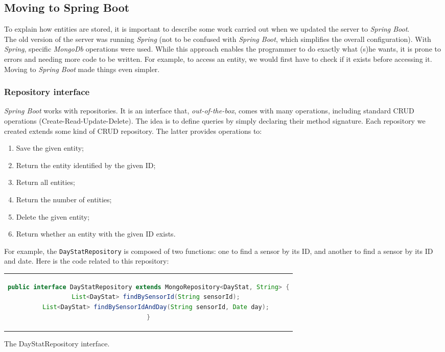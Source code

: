 \documentclass[a4paper, oneside, 11pt]{book}
\begin{document}
\subsection{Moving to Spring Boot}
To explain how entities are stored, it is important to describe some work carried out when we updated the server to \textit{Spring Boot}.\\

The old version of the server was running \textit{Spring} (not to be confused with \textit{Spring Boot}, which simplifies the overall configuration). With \textit{Spring}, specific \textit{MongoDb} operations were used. While this approach enables the programmer to do exactly what (s)he wants, it is prone to errors and needing more code to be written. For example, to access an entity, we would first have to check if it exists before accessing it. Moving to \textit{Spring Boot}  made things even simpler.

\subsubsection{Repository interface}
\textit{Spring Boot} works with repositories. It is an interface that, \emph{out-of-the-box}, comes with many operations, including standard CRUD operations (Create-Read-Update-Delete). The idea is to define queries by simply declaring their method signature. Each repository we created extends some kind of CRUD repository. The latter provides operations to:
\begin{enumerate}
	\item Save the given entity;
	\item Return the entity identified by the given ID;
	\item Return all entities;
	\item Return the number of entities;
	\item Delete the given entity;
	\item Return whether an entity with the given ID exists.
\end{enumerate}

For example, the \texttt{DayStatRepository} is composed of two functions: one to find a sensor by its ID, and another to find a sensor by its ID and date. Here is the code related to this repository:

\begin{listing}[!h]
	\centering
	\begin{tabular}{c}
		\begin{lstlisting}[language=Java]
public interface DayStatRepository extends MongoRepository<DayStat, String> {
    List<DayStat> findBySensorId(String sensorId);
    List<DayStat> findBySensorIdAndDay(String sensorId, Date day);
}
		\end{lstlisting}
	\end{tabular}
	\caption{The DayStatRepository interface.}
	\label{lst:sensorretriever}
\end{listing}
\end{document}
